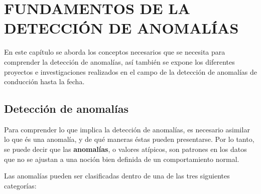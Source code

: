 
\chapter{\uppercase{Fundamentos de la detecci\'{o}n de anomal\'{i}as}}

\label{Capitulo 2}

En este cap\'{i}tulo se aborda los conceptos necesarios que se necesita para comprender la detecci\'{o}n de anomal\'{i}as, as\'{i} tambi\'{e}n se expone los diferentes proyectos e investigaciones realizados en el campo de la detecci\'{o}n de anomal\'{i}as de conducci\'{o}n hasta la fecha.

\section{Detecci\'{o}n de anomal\'{i}as}

Para comprender lo que implica la detecci\'{o}n de anomal\'{i}as, es necesario asimilar lo que \'{e}s una anomal\'{i}a, y de qu\'{e} maneras \'{e}stas pueden presentarse. Por lo tanto, se puede decir que las \textbf{anomalías}, o valores at\'{i}picos, son patrones en los datos que no se ajustan a una noción bien definida de un comportamiento normal.

\vspace{5mm} %

Las anomal\'{i}as pueden ser clasificadas dentro de una de las tres siguientes categor\'{i}as:

